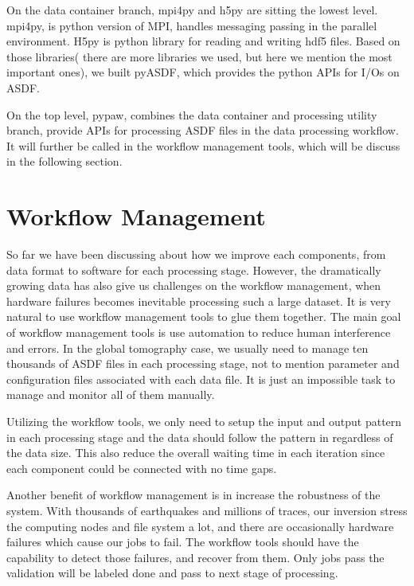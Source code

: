 On the data container branch, mpi4py and h5py are sitting the lowest level. mpi4py,
is python version of MPI, handles messaging passing in the parallel environment.
H5py is python library for reading and writing hdf5 files. Based on those libraries(
there are more libraries we used, but here we mention the most important ones), we built
pyASDF, which provides the python APIs for I/Os on ASDF.

On the top level, pypaw, combines the data container and processing utility branch,
 provide APIs for processing ASDF files in the data processing workflow. It will
 further be called in the workflow management tools, which will
 be discuss in the following section.

\section{Workflow Management}
\label{section:workflow_management}

So far we have been discussing about how we improve each components, from data format
to software for each processing stage. 
However, the dramatically growing data has also give us challenges on the workflow management,
when hardware failures becomes inevitable processing such a large dataset.
It is very natural to use workflow management tools to glue them together.
The main goal of workflow management tools is use automation to
reduce human interference and errors. In the global tomography case,
we usually need to manage ten thousands of ASDF files in each processing stage,
not to mention parameter and configuration files associated with
each data file. It is just an impossible task to manage and monitor
all of them manually.

Utilizing the workflow tools, we only need to setup the input and output
pattern in each processing stage and the data should
follow the pattern in regardless of the data size.
This also reduce the overall waiting time in each iteration since
each component could be connected with no time gaps. 

Another benefit of workflow management is in increase the robustness of the system.
With thousands of earthquakes and millions of traces, our inversion stress the
computing nodes and file system a lot, and there are occasionally hardware failures
which cause our jobs to fail. The workflow tools should have the capability to
detect those failures, and recover from them. Only jobs pass the validation will
be labeled done and pass to next stage of processing.

